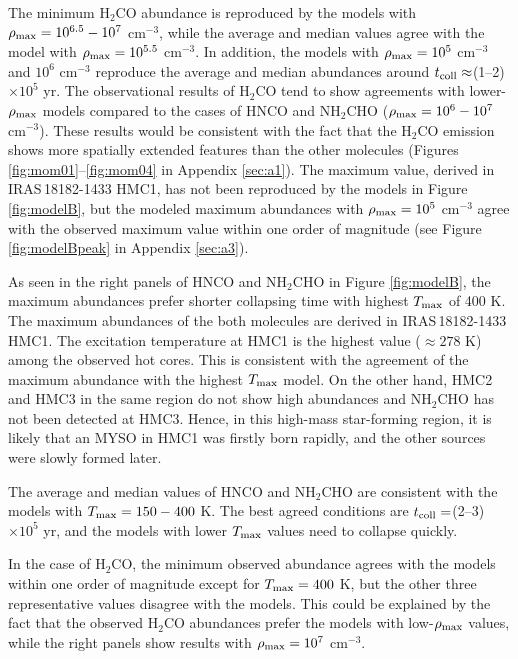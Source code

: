 \documentclass[twocolumn, twocolappendix]{aastex631}
\begin{document}
The minimum H$_{2}$CO abundance is reproduced by the models with $\rho_{\rm {max}}=10^{6.5}-10^{7}$ cm$^{-3}$, while the average and median values agree with the model with $\rho_{\rm {max}}=10^{5.5}$ cm$^{-3}$. %
In addition, the models with $\rho_{\rm {max}}=10^{5}$ cm$^{-3}$ and $10^{6}$ cm$^{-3}$ reproduce the average and median abundances around $t_{\rm {coll}}\approx$(1--2)$\times10^{5}$ yr.
The observational results of H$_{2}$CO tend to show agreements with lower-$\rho_{\rm {max}}$ models compared to the cases of HNCO and NH$_{2}$CHO ($\rho_{\rm {max}}=10^{6}-10^{7}$ cm$^{-3}$).
These results would be consistent with the fact that the H$_{2}$CO emission shows more spatially extended features than the other molecules (Figures \ref{fig:mom01}--\ref{fig:mom04} in Appendix \ref{sec:a1}).
The maximum value, derived in IRAS\,18182-1433 HMC1, has not been reproduced by the models in Figure \ref{fig:modelB}, but the modeled maximum abundances with $\rho_{\rm {max}}=10^{5}$ cm$^{-3}$ agree with the observed maximum value within one order of magnitude (see Figure \ref{fig:modelBpeak} in Appendix \ref{sec:a3}).

As seen in the right panels of HNCO and NH$_{2}$CHO in Figure \ref{fig:modelB}, the maximum abundances prefer shorter collapsing time with highest $T_{\rm {max}}$ of 400 K.
The maximum abundances of the both molecules are derived in IRAS\,18182-1433 HMC1.
The excitation temperature at HMC1 is the highest value ($\approx 278$ K) among the observed hot cores.
This is consistent with the agreement of the maximum abundance with the highest $T_{\rm {max}}$ model.
On the other hand, HMC2 and HMC3 in the same region do not show high abundances and NH$_{2}$CHO has not been detected at HMC3.
Hence, in this high-mass star-forming region, it is likely that an MYSO in HMC1 was firstly born rapidly, and the other sources were slowly formed later. 

The average and median values of HNCO and NH$_{2}$CHO are consistent with the models with $T_{\rm {max}}=150-400$ K.
The best agreed conditions are $t_{\rm {coll}}=$(2--3)$\times10^{5}$ yr, and the models with lower $T_{\rm {max}}$ values need to collapse quickly.

In the case of H$_{2}$CO, the minimum observed abundance agrees with the models within one order of magnitude except for $T_{\rm {max}}=400$ K, but the other three representative values disagree with the models.
This could be explained by the fact that the observed H$_{2}$CO abundances prefer the models with low-$\rho_{\rm {max}}$ values, while the right panels show results with $\rho_{\rm {max}}=10^{7}$ cm$^{-3}$.
\end{document}
